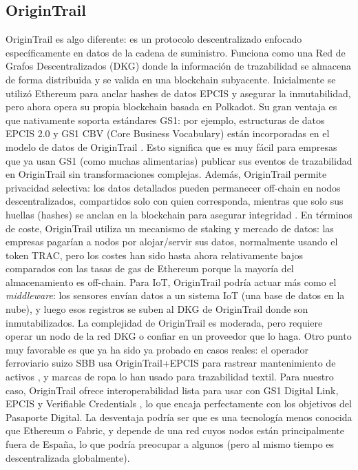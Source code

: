 \subsection{OriginTrail}\label{sec:estado-origin}
OriginTrail es algo diferente: es un protocolo descentralizado enfocado específicamente en datos de la cadena de suministro. Funciona como una Red de Grafos Descentralizados (DKG) donde la información de trazabilidad se almacena de forma distribuida y se valida en una blockchain subyacente. Inicialmente se utilizó Ethereum para anclar hashes de datos EPCIS y asegurar la inmutabilidad, pero ahora opera su propia blockchain basada en Polkadot. Su gran ventaja es que nativamente soporta estándares GS1: por ejemplo, estructuras de datos EPCIS 2.0 y GS1 CBV (Core Business Vocabulary) están incorporadas en el modelo de datos de OriginTrail \cite{noauthor_whats_2025}\cite{rakic_first_nodate}. Esto significa que es muy fácil para empresas que ya usan GS1 (como muchas alimentarias) publicar sus eventos de trazabilidad en OriginTrail sin transformaciones complejas. Además, OriginTrail permite privacidad selectiva: los datos detallados pueden permanecer off-chain en nodos descentralizados, compartidos solo con quien corresponda, mientras que solo sus huellas (hashes) se anclan en la blockchain para asegurar integridad \cite{noauthor_origintrail_nodate}. En términos de coste, OriginTrail utiliza un mecanismo de staking y mercado de datos: las empresas pagarían a nodos por alojar/servir sus datos, normalmente usando el token TRAC, pero los costes han sido hasta ahora relativamente bajos comparados con las tasas de gas de Ethereum porque la mayoría del almacenamiento es off-chain. Para IoT, OriginTrail podría actuar más como el \textit{middleware}: los sensores envían datos a un sistema IoT (una base de datos en la nube), y luego esos registros se suben al DKG de OriginTrail donde son inmutabilizados. La complejidad de OriginTrail es moderada, pero requiere operar un nodo de la red DKG o confiar en un proveedor que lo haga. Otro punto muy favorable es que ya ha sido ya probado en casos reales: el operador ferroviario suizo SBB usa OriginTrail+EPCIS para rastrear mantenimiento de activos , y marcas de ropa lo han usado para trazabilidad textil. Para nuestro caso, OriginTrail ofrece interoperabilidad lista para usar con GS1 Digital Link, EPCIS y Verifiable Credentials , lo que encaja perfectamente con los objetivos del Pasaporte Digital. La desventaja podría ser que es una tecnología menos conocida que Ethereum o Fabric, y depende de una red cuyos nodos están principalmente fuera de España, lo que podría preocupar a algunos (pero al mismo tiempo es descentralizada globalmente).

